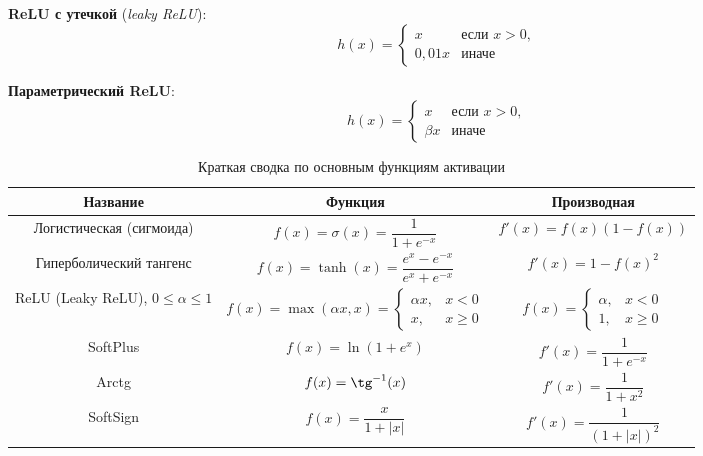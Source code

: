 \begin{definition}
    \textbf{ReLU с утечкой} (\textit{leaky ReLU}):
    \[
        h(x)=
        \begin{cases}
            x     & \text{если }x>0,\\
            0,01x & \text{иначе}
        \end{cases}
    \]
\end{definition}

\begin{definition}
    \textbf{Параметрический ReLU}:
    \[
        h(x)=
        \begin{cases}
            x       & \text{если }x>0,\\
            \beta x & \text{иначе}
        \end{cases}
    \]
\end{definition}

\begin{table}[htb]
    \begin{tabular}{@{}|c|c|c|@{}}
    \toprule
    \textbf{Название}        & \textbf{Функция}                               & \textbf{Производная}         \\ \midrule
    Логистическая (сигмоида) & $f(x)=\sigma(x)=\dfrac{1}{1+e^{-x}}$           & $f'(x)=f(x)(1-f(x))$         \\ \midrule
    Гиперболический тангенс  & $f(x)=\tanh(x)=\dfrac{e^x-e^{-x}}{e^x+e^{-x}}$ & $f'(x)=1-f(x)^2$             \\ \midrule
    ReLU (Leaky ReLU), $0\leq\alpha\leq1$ & $f(x)=\max(\alpha x, x)=\begin{cases}\alpha x,&x<0\\x,&x\geq0\end{cases}$ & $f(x)=\begin{cases}\alpha,&x<0\\1,&x\geq0\end{cases}$ \\ \midrule
    SoftPlus                 & $f(x)=\ln(1+e^x)$                              & $f'(x)=\dfrac{1}{1+e^{-x}}$  \\ \midrule
    Arctg                    & $f(x)=\tg^{-1}(x)$                             & $f'(x)=\dfrac{1}{1+x^2}$     \\ \midrule
    SoftSign                 & $f(x)=\dfrac{x}{1+|x|}$                        & $f'(x)=\dfrac{1}{(1+|x|)^2}$ \\ \bottomrule
    \end{tabular}
    \caption{Краткая сводка по основным функциям активации}
\end{table}

